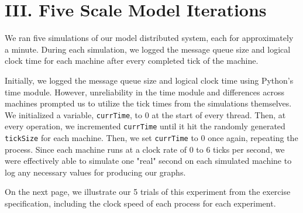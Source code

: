 \documentclass[
	a4paper, %
	10pt, %
	unnumberedsections, %
	twoside, %
]{LTJournalArticle}
\begin{document}
\section{III. Five Scale Model Iterations}

We ran five simulations of our model distributed system, each for approximately a minute. During each simulation, we logged the message queue size and logical clock time for each machine after every completed tick of the machine. 
    
Initially, we logged the message queue size and logical clock time using Python's time module. However, unreliability in the time module and differences across machines prompted us to utilize the tick times from the simulations themselves. We initialized a variable, \texttt{currTime}, to 0 at the start of every thread. Then, at every operation, we incremented \texttt{currTime} until it hit the randomly generated \texttt{tickSize} for each machine. Then, we set \texttt{currTime} to 0 once again, repeating the process. Since each machine runs at a clock rate of 0 to 6 ticks per second, we were effectively able to simulate one "real" second on each simulated machine to log any necessary values for producing our graphs. 

On the next page, we illustrate our 5 trials of this experiment from the exercise specification, including the clock speed of each process for each experiment.  
\end{document}
